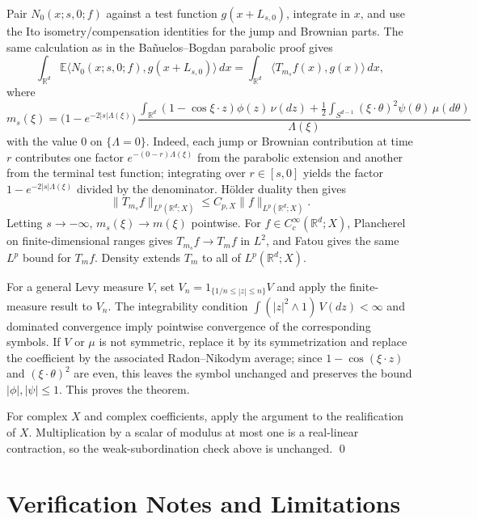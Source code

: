 \documentclass[11pt]{article}
\newcommand{\R}{\mathbb R}
\newcommand{\E}{\mathbb E}
\begin{document}
Pair $N_0(x;s,0;f)$ against a test function
$g(x+L_{s,0})$, integrate in $x$, and use the Ito isometry/compensation
identities for the jump and Brownian parts.  The same calculation as in the
Ba\~nuelos--Bogdan parabolic proof gives
\[
 \int_{\R^d}\E\langle N_0(x;s,0;f),g(x+L_{s,0})\rangle\,dx
 =
 \int_{\R^d}\langle T_{m_s}f(x),g(x)\rangle\,dx,
\]
where
\[
 m_s(\xi)
 =
 \bigl(1-e^{-2|s|\Lambda(\xi)}\bigr)\,
 \frac{
 \int_{\R^d}(1-\cos \xi\cdot z)\phi(z)\,\nu(dz)
 +\frac12\int_{S^{d-1}}(\xi\cdot\theta)^2\psi(\theta)\,\mu(d\theta)}
 {\Lambda(\xi)}
\]
with the value $0$ on $\{\Lambda=0\}$.  Indeed, each jump or Brownian
contribution at time $r$ contributes one factor $e^{-(0-r)\Lambda(\xi)}$ from
the parabolic extension and another from the terminal test function; integrating
over $r\in[s,0]$ yields the factor $1-e^{-2|s|\Lambda(\xi)}$ divided by the
denominator.  H\"older duality then gives
\[
        \|T_{m_s}f\|_{L^p(\R^d;X)}
        \leq C_{p,X}\|f\|_{L^p(\R^d;X)} .
\]
Letting $s\to-\infty$, $m_s(\xi)\to m(\xi)$ pointwise.  For
$f\in C_c^\infty(\R^d;X)$, Plancherel on finite-dimensional ranges gives
$T_{m_s}f\to T_mf$ in $L^2$, and Fatou gives the same $L^p$ bound for $T_mf$.
Density extends $T_m$ to all of $L^p(\R^d;X)$.

For a general Levy measure $V$, set
$V_n=1_{\{1/n\leq |z|\leq n\}}V$ and apply the finite-measure result to $V_n$.
The integrability condition
$\int(|z|^2\wedge1)\,V(dz)<\infty$ and dominated convergence imply pointwise
convergence of the corresponding symbols.  If $V$ or $\mu$ is not symmetric,
replace it by its symmetrization and replace the coefficient by the associated
Radon--Nikodym average; since $1-\cos(\xi\cdot z)$ and
$(\xi\cdot\theta)^2$ are even, this leaves the symbol unchanged and preserves
the bound $|\phi|,|\psi|\leq1$.  This proves the theorem.

For complex $X$ and complex coefficients, apply the argument to the realification
of $X$.  Multiplication by a scalar of modulus at most one is a real-linear
contraction, so the weak-subordination check above is unchanged.
\qed

\section*{Verification Notes and Limitations}
\end{document}
